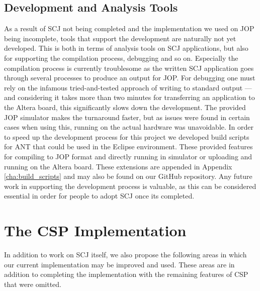 \subsection{Development and Analysis Tools} %
\label{sub:development_and_analysis_tools}
As a result of SCJ not being completed and the implementation we used on JOP being incomplete, tools that support the development are naturally not yet developed. This is both in terms of analysis tools on SCJ applications, but also for supporting the compilation process, debugging and so on. Especially the compilation process is currently troublesome as the written SCJ application goes through several processes to produce an output for JOP. For debugging one must rely on the infamous tried-and-tested approach of writing to standard output --- and considering it takes more than two minutes for transferring an application to the Altera board, this significantly slows down the development. The provided JOP simulator makes the turnaround faster, but as issues were found in certain cases when using this, running on the actual hardware was unavoidable. In order to speed up the development process for this project we developed build scripts for ANT that could be used in the Eclipse environment. These provided features for compiling to JOP format and directly running in simulator or uploading and running on the Altera board. These extensions are appended in Appendix \ref{cha:build_scripts} and may also be found on our GitHub repository\cite{SW902e12:CSPinSCJ}. Any future work in supporting the development process is valuable, as this can be considered essential in order for people to adopt SCJ once its completed.




\section{The CSP Implementation} %
\label{sec:the_csp_implementation}
In addition to work on SCJ itself, we also propose the following areas in which our current implementation may be improved and used. These areas are in addition to completing the implementation with the remaining features of CSP that were omitted.

